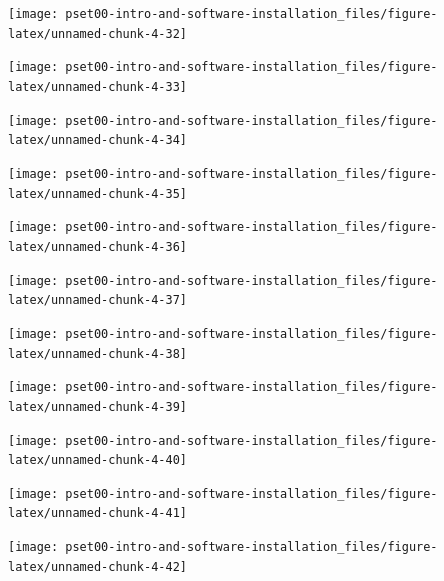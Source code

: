 \documentclass[
]{article}
\begin{document}
\begin{center}\texttt{[image: pset00-intro-and-software-installation\_files/figure-latex/unnamed-chunk-4-32]} \end{center}

\begin{center}\texttt{[image: pset00-intro-and-software-installation\_files/figure-latex/unnamed-chunk-4-33]} \end{center}

\begin{center}\texttt{[image: pset00-intro-and-software-installation\_files/figure-latex/unnamed-chunk-4-34]} \end{center}

\begin{center}\texttt{[image: pset00-intro-and-software-installation\_files/figure-latex/unnamed-chunk-4-35]} \end{center}

\begin{center}\texttt{[image: pset00-intro-and-software-installation\_files/figure-latex/unnamed-chunk-4-36]} \end{center}

\begin{center}\texttt{[image: pset00-intro-and-software-installation\_files/figure-latex/unnamed-chunk-4-37]} \end{center}

\begin{center}\texttt{[image: pset00-intro-and-software-installation\_files/figure-latex/unnamed-chunk-4-38]} \end{center}

\begin{center}\texttt{[image: pset00-intro-and-software-installation\_files/figure-latex/unnamed-chunk-4-39]} \end{center}

\begin{center}\texttt{[image: pset00-intro-and-software-installation\_files/figure-latex/unnamed-chunk-4-40]} \end{center}

\begin{center}\texttt{[image: pset00-intro-and-software-installation\_files/figure-latex/unnamed-chunk-4-41]} \end{center}

\begin{center}\texttt{[image: pset00-intro-and-software-installation\_files/figure-latex/unnamed-chunk-4-42]} \end{center}
\end{document}
